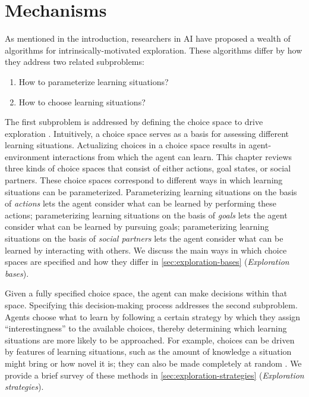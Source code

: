 \section{Mechanisms}\label{sec:3-mechanisms}
As mentioned in the introduction, researchers in \ac{AI} have proposed a wealth of algorithms for intrinsically-motivated exploration. These algorithms differ by how they address two related subproblems:

\begin{enumerate}
    \item How to parameterize learning situations?
    \item How to choose learning situations?
\end{enumerate}

The first subproblem is addressed by defining the choice space to drive exploration \cite{moulin-frier_exploration_2013}. Intuitively, a choice space serves as a basis for assessing different learning situations. Actualizing choices in a choice space results in agent-environment interactions from which the agent can learn. This chapter reviews three kinds of choice spaces that consist of either actions, goal states, or social partners. These choice spaces correspond to different ways in which learning situations can be parameterized. Parameterizing learning situations on the basis of \emph{actions} lets the agent consider what can be learned by performing these actions; parameterizing learning situations on the basis of \emph{goals} lets the agent consider what can be learned by pursuing goals; parameterizing learning situations on the basis of \emph{social partners} lets the agent consider what can be learned by interacting with others. We discuss the main ways in which choice spaces are specified and how they differ in \autoref{sec:exploration-bases} (\textit{Exploration bases}).

Given a fully specified choice space, the agent can make decisions within that space. Specifying this decision-making process addresses the second subproblem. Agents choose what to learn by following a certain strategy by which they assign “interestingness” to the available choices, thereby determining which learning situations are more likely to be approached. For example, choices can be driven by features of learning situations, such as the amount of knowledge a situation might bring or how novel it is; they can also be made completely at random \cite[e.g., ][]{colas_gep-pg_2018,colas_language_2020}. We provide a brief survey of these methods in \autoref{sec:exploration-strategies} (\textit{Exploration strategies}).

